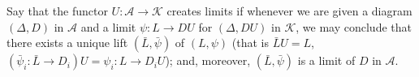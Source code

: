 Say that the functor $U: \mathcal{A} \longrightarrow \mathcal{K}$ creates limits if whenever we are given a diagram $(\Delta, D)$ in $\mathcal{A}$ and a limit $\psi: L \longrightarrow DU$ for $(\Delta, DU)$ in $\mathcal{K}$, we may conclude that there exists a unique lift $(\bar{L}, \bar{\psi})$ of $(L, \psi)$ (that is $\bar{L}U = L$, $(\bar{\psi}_i: \bar{L} \longrightarrow D_i)U = \psi_i: L \longrightarrow D_iU$); and, moreover, $(\bar{L}, \bar{\psi})$ is a limit of $D$ in $\mathcal{A}$.
